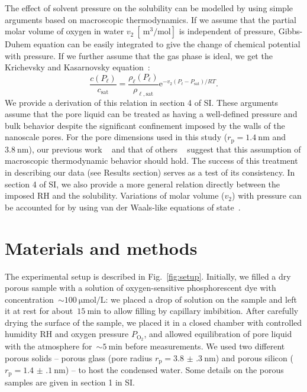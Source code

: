 \documentclass[aps,prl,twocolumn,superscriptaddress,groupedaddress]{revtex4}
\begin{document}
The effect of solvent pressure on the solubility can be modelled by using simple arguments based on macroscopic thermodynamics. If we assume that the partial molar volume of oxygen in water $v_2 \ [\SI{}{\meter\cubed\per\mole}]$ is independent of pressure, Gibbs-Duhem equation can be easily integrated to give the change of chemical potential with pressure. If we further assume that the gas phase is ideal, we get the Krichevsky and Kasarnovsky equation~\cite{krichevsky_1935}:
\begin{equation}
\frac{c(P_\ell)}{c_\text{sat}} = \frac{\rho_\ell(P_\ell)}{\rho_{\ell,\text{sat}}} \mathrm{e}^{-v_2 (P_\ell - P_\text{sat}) / RT}.
\label{eq:KK_equation}
\end{equation}
\noindent We provide a derivation of this relation in section 4 of SI. These arguments assume that the pore liquid can be treated as having a well-defined pressure and bulk behavior despite the significant confinement imposed by the walls of the nanoscale pores. For the pore dimensions used in this study ($r_\text{p} = \SI{1.4}{\nano\meter}$ and $\SI{3.8}{\nano\meter}$), our previous work ~\cite{vincent_2016} and that of others ~\cite{bocquet_2010} suggest that this assumption of macroscopic thermodynamic behavior should hold. The success of this treatment in describing our data (see Results section) serves as a test of its consistency. In section 4 of SI, we also provide a more general relation directly between the imposed $\mathrm{RH}$ and the solubility. Variations of molar volume ($v_2$) with pressure can be accounted for by using van der Waals-like equations of state~\cite{widom_2012,cerdeirina_2016}.


\section{Materials and methods}

The experimental setup is described in Fig.~\ref{fig:setup}. Initially, we filled a dry porous sample with a solution of oxygen-sensitive phosphorescent dye with concentration~$\sim \SI{100}{\micro\mole\per\liter}$: we placed a drop of solution on the sample and left it at rest for about~$\SI{15}{\minute}$ to allow filling by capillary imbibition. After carefully drying the surface of the sample, we placed it in a closed chamber with controlled humidity $\mathrm{RH}$ and oxygen pressure $P_\mathrm{O_2}$, and allowed equilibration of pore liquid with the atmosphere for~$\sim \SI{5}{\minute}$ before measurements. We used two different porous solids -- porous glass (pore radius $r_\text{p}=\SI{3.8(3)}{\nano\meter}$) and porous silicon ($r_\text{p}=\SI{1.4(1)}{\nano\meter}$) -- to host the condensed water. Some details on the porous samples are given in section 1 in SI.
\end{document}
